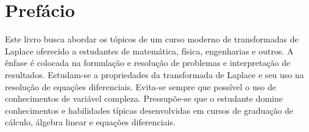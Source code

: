 
\chapter*{Prefácio}

Este livro busca abordar os tópicos de um curso moderno de transformadas de Laplace oferecido a estudantes de matemática, física, engenharias e outros. A ênfase é colocada na formulação e resolução de problemas e interpretação de resultados. Estudam-se a propriedades da transformada de Laplace e seu uso na resolução de equações diferenciais. Evita-se sempre que possível o uso de conhecimentos de variável compleza. Pressupõe-se que o estudante domine conhecimentos e habilidades típicas desenvolvidas em cursos de graduação de cálculo, álgebra linear e equações diferenciais. 

